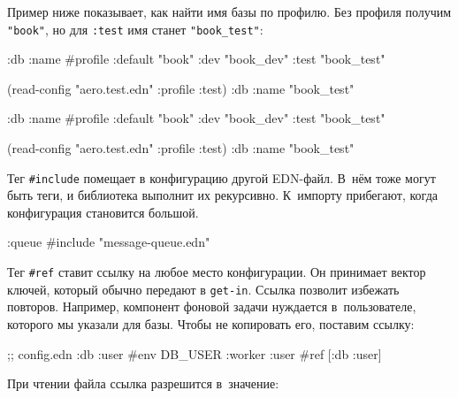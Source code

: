 Пример ниже показывает, как найти имя базы по профилю. Без профиля получим
\verb|"book"|, но для \verb|:test| имя станет \verb|"book_test"|:

\ifnarrow

\begin{english}
  \begin{clojure}
{:db
 {:name
  #profile {:default "book"
            :dev     "book_dev"
            :test    "book_test"}}}

(read-config "aero.test.edn"
  {:profile :test})
{:db {:name "book_test"}}
  \end{clojure}
\end{english}

\else

\begin{english}
  \begin{clojure}
{:db {:name #profile {:default "book"
                      :dev     "book_dev"
                      :test    "book_test"}}}

(read-config "aero.test.edn" {:profile :test})
{:db {:name "book_test"}}
  \end{clojure}
\end{english}

\fi

Тег \verb|#include| помещает в конфигурацию другой EDN-файл. В~нём тоже могут
быть теги, и библиотека выполнит их рекурсивно. К~импорту прибегают, когда
конфигурация становится большой.

\begin{english}
  \begin{clojure}
{:queue #include "message-queue.edn"}
  \end{clojure}
\end{english}

Тег \verb|#ref| ставит ссылку на любое место конфигурации. Он принимает вектор
ключей, который обычно передают в \verb|get-in|. Ссылка позволит избежать
повторов.  Например, компонент фоновой задачи нуждается в~пользователе, которого
мы указали для базы. Чтобы не копировать его, поставим ссылку:

\begin{english}
  \begin{clojure}
;; config.edn
{:db {:user #env DB_USER}
 :worker {:user #ref [:db :user]}}
  \end{clojure}
\end{english}

\noindent
При чтении файла ссылка разрешится в~значение:

